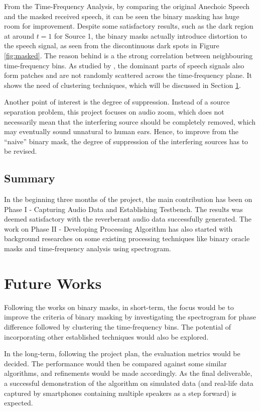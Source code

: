 \documentclass[a4paper,twoside,12pt,hidelinks]{article}
\begin{document}
From the Time-Frequency Analysis, by comparing the original Anechoic Speech and the masked received speech, it can be seen the binary masking has huge room for improvement. Despite some satisfactory results, such as the dark region at around $t=1$ for Source 1, the binary masks actually introduce distortion to the speech signal, as seen from the discontinuous dark spots in Figure \ref{fig:masked}. The reason behind is a the strong correlation between neighbouring time-frequency bins. As studied by \cite{Faller2004SourceCoherence}, the dominant parts of speech signals also form patches and are not randomly scattered across the time-frequency plane. It shows the need of clustering techniques, which will be discussed in Section \ref{futureworks}.

Another point of interest is the degree of suppression. Instead of a source separation problem, this project focuses on audio zoom, which does not necessarily mean that the interfering source should be completely removed, which may eventually sound unnatural to human ears. Hence, to improve from the ``naive'' binary mask, the degree of suppression of the interfering sources has to be revised.

\subsection{Summary}
In the beginning three months of the project, the main contribution has been on Phase I - Capturing Audio Data and Establishing Testbench. The results was deemed satisfactory with the reverberant audio data successfully generated. The work on Phase II - Developing Processing Algorithm has also started with background researches on some existing processing techniques like binary oracle masks and time-frequency analysis using spectrogram.
\newpage
\section{Future Works}
\label{futureworks}
Following the works on binary masks, in short-term, the focus would be to improve the criteria of binary masking by investigating the spectrogram for phase difference followed by clustering the time-frequency bins. The potential of incorporating other established techniques would also be explored.

In the long-term, following the project plan, the evaluation metrics would be decided. The performance would then be compared against some similar algorithms, and refinements would be made accordingly. As the final deliverable, a successful demonstration of the algorithm on simulated data (and real-life data captured by smartphones containing multiple speakers as a step forward) is expected. 
\end{document}
